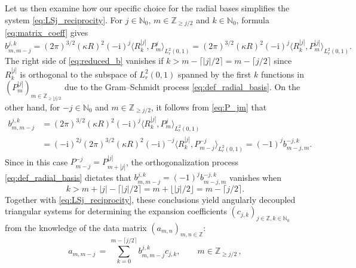 \documentclass[11pt,a4paper]{article}
\theoremstyle{definition}
\theoremstyle{remark} \newtheorem{remark}[theorem]{Remark}
\numberwithin{equation}{section}
\numberwithin{figure}{section}
\numberwithin{algorithm}{section}
\numberwithin{table}{section}
\newcommand{\field}[1]{{\mathbb{#1}}}
\newcommand{\N}{\field{N}}
\newcommand{\Z}{\field{Z}}
\newcommand{\rmi}{\mathrm{i}}
\begin{document}
Let us then examine how our specific choice for the radial bases simplifies the system \eqref{eq:LSj_reciprocity}. For $j \in \N_0$, $m \in \Z_{\geq j/2}$ and $k \in \N_0$,  formula \eqref{eq:matrix_coeff} gives
\begin{equation}
\label{eq:reduced_b}
b_{m,m-j}^{j,k} = (2\pi)^{3/2}(\kappa R)^2(-\rmi)^{j} \big\langle R^{|j|}_{k}, P_m^{j} \big\rangle_{L^2_r(0,1)} = (2\pi)^{3/2}(\kappa R)^2(-\rmi)^{j} \big\langle R^{|j|}_{k}, P_m^{|j|} \big\rangle_{L^2_r(0,1)}.
\end{equation}
The right side of \eqref{eq:reduced_b} vanishes if $k > m-\lceil |j|/2\rceil = m-\lceil j/2\rceil$ since $R^{|j|}_{k}$ is orthogonal to the subspace of $L^2_r(0,1)$ spanned by the first $k$ functions in $(P_{m}^{|j|})_{m \in \Z_{\geq |j|/2}}$ due to the Gram--Schmidt process \eqref{eq:def_radial_basis}. On the other hand, for $-j \in \N_0$ and $m \in \Z_{\geq j/2}$, it follows from \eqref{eq:P_jm} that
\begin{align}
b_{m,m-j}^{j,k} &= (2\pi)^{3/2}(\kappa R)^2(-\rmi)^{j} \big\langle R^{|j|}_{k}, P_m^{j} \big\rangle_{L^2_r(0,1)} \nonumber \\[1mm ]
&= (-\rmi)^{2j} (2\pi)^{3/2}(\kappa R)^2 (-\rmi)^{-j} \big\langle R^{|j|}_{k}, P_{m-j}^{-j} \big\rangle_{L^2_r(0,1)} = (-1)^{j} b_{m-j,m}^{-j,k}.
\label{eq:reduced_b_minus}
\end{align}
Since in this case $P_{m-j}^{-j} = P_{m+|j|}^{|j|}$, the orthogonalization process \eqref{eq:def_radial_basis} dictates that $b_{m,m-j}^{j,k} = (-1)^{j} b_{m-j,m}^{-j,k}$ vanishes when 
\begin{equation*}
k >  m + |j| - \lceil |j|/2\rceil =  m + \lfloor |j| /2\rfloor = m - \lceil j/2\rceil. 
\end{equation*}
Together with \eqref{eq:LSj_reciprocity}, these conclusions yield angularly decoupled triangular systems for determining the expansion coefficients $(c_{j,k})_{j \in \Z, k \in \N_0}$ from the knowledge of the data matrix $(a_{m,n})_{m,n\in \Z}$:
\begin{equation}
\label{eq:triangular0}
	a_{m,m-j}
	\,=\, \sum_{k=0}^{m-\lceil j/2\rceil} b_{m,m-j}^{j,k}c_{j,k}, \qquad m \in \Z_{\geq j/2} \, ,
\end{equation}
\end{document}
